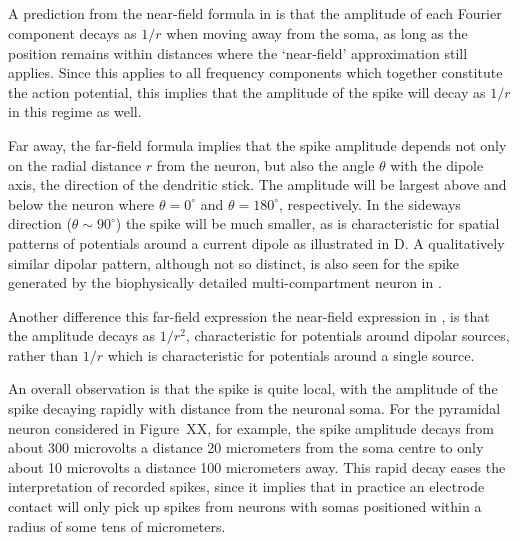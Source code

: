\subsection{}

A prediction from the near-field formula in  
is that the amplitude of each Fourier component decays as $1/r$ when moving away from the soma, 
as long as the position remains within distances where the `near-field' approximation still applies. 
Since this applies to all frequency components which together constitute the action potential, 
this implies that the amplitude of the spike will decay as $1/r$ in this regime as well. 

Far away, the far-field formula  
implies that the spike amplitude depends not only on the radial distance $r$ from the neuron, 
but also the angle $\theta$ with the dipole axis, the direction of the dendritic stick. 
The amplitude will be largest above and below the neuron where $\theta=0^\circ$ and $\theta=180^\circ$, 
respectively. 
In the sideways direction ($\theta \sim 90^\circ$) the spike will be much smaller, 
as is characteristic for spatial patterns of potentials around a current dipole as illustrated in D. 
A qualitatively similar dipolar pattern, although not so distinct, 
is also seen for the spike generated by the biophysically detailed multi-compartment neuron in 
.

Another difference  this far-field expression  the near-field expression in , is that the amplitude decays as $1/r^2$, 
characteristic for potentials around dipolar sources, 
rather than $1/r$ which is characteristic for potentials around a single source. 


An overall observation is that the spike is quite local, 
with the amplitude of the spike decaying rapidly with distance from the neuronal soma. 
For the pyramidal neuron considered in Figure~XX, for example, the spike amplitude decays from about
300 microvolts a distance 20 micrometers from the soma centre to only about 10 microvolts a
distance 100 micrometers away. 
This rapid decay eases the interpretation of recorded spikes, 
since it implies that in practice an electrode contact will only pick up spikes from neurons with somas 
positioned within a radius of some tens of micrometers.

